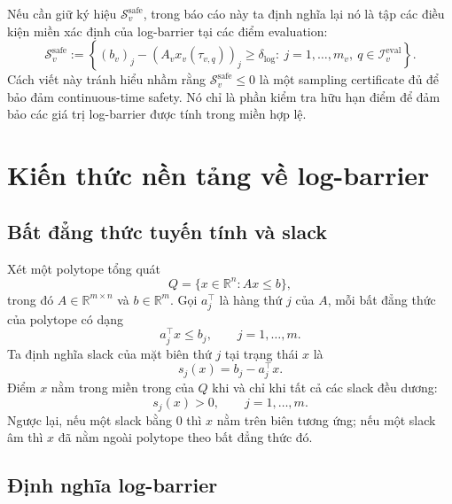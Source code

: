 \documentclass[12pt]{article}
\begin{document}
Nếu cần giữ ký hiệu $\mathcal S_v^{\mathrm{safe}}$, trong báo cáo này ta định nghĩa lại nó là tập các điều kiện miền xác định của log-barrier tại các điểm evaluation:
\begin{equation}
\mathcal S_v^{\mathrm{safe}}:=
\left\{
(b_v)_j-(A_vx_v(\tau_{v,q}))_j\ge \delta_{\log}
:\ j=1,\dots,m_v,\ q\in\mathcal I_v^{\mathrm{eval}}
\right\}.
\label{eq:safe_set_redefined}
\end{equation}
Cách viết này tránh hiểu nhầm rằng $\mathcal S_v^{\mathrm{safe}}\le 0$ là một sampling certificate đủ để bảo đảm continuous-time safety. Nó chỉ là phần kiểm tra hữu hạn điểm để đảm bảo các giá trị log-barrier được tính trong miền hợp lệ.

\section{Kiến thức nền tảng về log-barrier}

\subsection{Bất đẳng thức tuyến tính và slack}

Xét một polytope tổng quát
\begin{equation}
Q=\{x\in\mathbb R^n:Ax\le b\},
\label{eq:generic_polytope}
\end{equation}
trong đó $A\in\mathbb R^{m\times n}$ và $b\in\mathbb R^m$. Gọi $a_j^\top$ là hàng thứ $j$ của $A$, mỗi bất đẳng thức của polytope có dạng
\begin{equation}
a_j^\top x\le b_j,\qquad j=1,\dots,m.
\label{eq:single_halfspace}
\end{equation}
Ta định nghĩa slack của mặt biên thứ $j$ tại trạng thái $x$ là
\begin{equation}
s_j(x)=b_j-a_j^\top x.
\label{eq:slack_generic}
\end{equation}
Điểm $x$ nằm trong miền trong của $Q$ khi và chỉ khi tất cả các slack đều dương:
\begin{equation}
s_j(x)>0,
\qquad j=1,\dots,m.
\label{eq:interior_slack}
\end{equation}
Ngược lại, nếu một slack bằng $0$ thì $x$ nằm trên biên tương ứng; nếu một slack âm thì $x$ đã nằm ngoài polytope theo bất đẳng thức đó.

\subsection{Định nghĩa log-barrier}
\end{document}
